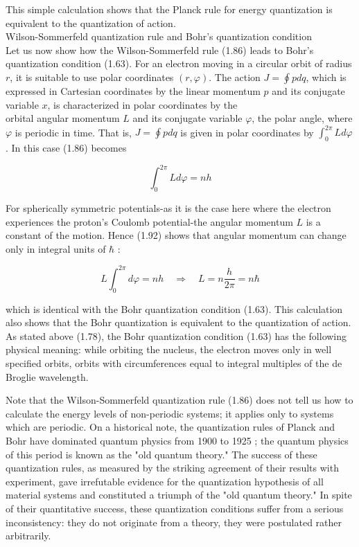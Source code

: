 \documentclass[10pt]{article}
\begin{document}
This simple calculation shows that the Planck rule for energy quantization is equivalent to the quantization of action.\\
Wilson-Sommerfeld quantization rule and Bohr's quantization condition\\
Let us now show how the Wilson-Sommerfeld rule (1.86) leads to Bohr's quantization condition (1.63). For an electron moving in a circular orbit of radius $r$, it is suitable to use polar coordinates $(r, \varphi)$. The action $J=\oint p d q$, which is expressed in Cartesian coordinates by the linear momentum $p$ and its conjugate variable $x$, is characterized in polar coordinates by the\\
orbital angular momentum $L$ and its conjugate variable $\varphi$, the polar angle, where $\varphi$ is periodic in time. That is, $J=\oint p d q$ is given in polar coordinates by $\int_{0}^{2 \pi} L d \varphi$. In this case (1.86) becomes


\begin{equation*}
\int_{0}^{2 \pi} L d \varphi=n h \tag{1.92}
\end{equation*}


For spherically symmetric potentials-as it is the case here where the electron experiences the proton's Coulomb potential-the angular momentum $L$ is a constant of the motion. Hence (1.92) shows that angular momentum can change only in integral units of $\hbar$ :


\begin{equation*}
L \int_{0}^{2 \pi} d \varphi=n h \quad \Longrightarrow \quad L=n \frac{h}{2 \pi}=n \hbar \tag{1.93}
\end{equation*}


which is identical with the Bohr quantization condition (1.63). This calculation also shows that the Bohr quantization is equivalent to the quantization of action. As stated above (1.78), the Bohr quantization condition (1.63) has the following physical meaning: while orbiting the nucleus, the electron moves only in well specified orbits, orbits with circumferences equal to integral multiples of the de Broglie wavelength.

Note that the Wilson-Sommerfeld quantization rule (1.86) does not tell us how to calculate the energy levels of non-periodic systems; it applies only to systems which are periodic. On a historical note, the quantization rules of Planck and Bohr have dominated quantum physics from 1900 to 1925 ; the quantum physics of this period is known as the "old quantum theory." The success of these quantization rules, as measured by the striking agreement of their results with experiment, gave irrefutable evidence for the quantization hypothesis of all material systems and constituted a triumph of the "old quantum theory." In spite of their quantitative success, these quantization conditions suffer from a serious inconsistency: they do not originate from a theory, they were postulated rather arbitrarily.
\end{document}
